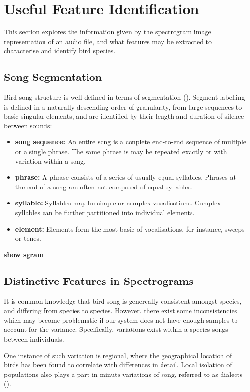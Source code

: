\section{Useful Feature Identification}
This section explores the information given by the spectrogram image
representation of an audio file, and what features may be extracted to
characterise and identify bird species.

\subsection{Song Segmentation}
Bird song structure is well defined in terms of segmentation (\textcite{Catch1997}).
Segment labelling is defined in a naturally descending order of granularity, from
large sequences to basic singular elements, and are identified by their length
and duration of silence between sounds:
\begin{itemize}
  \item \textbf{song sequence:}
    An entire song is a conplete end-to-end sequence of multiple or a single
    phrase.
    The same phrase is may be repeated exactly or with variation within a
    song.
  \item \textbf{phrase:}
    A phrase consists of a series of usually equal syllables.
    Phrases at the end of a song are often not composed of equal syllables.
  \item \textbf{syllable:}
    Syllables may be simple or complex vocalisations.
    Complex syllables can be further partitioned into individual elements.
  \item \textbf{element:}
    Elements form the most basic of vocalisations, for instance, sweeps or tones.
\end{itemize}

\textbf{show sgram}

\subsection{Distinctive Features in Spectrograms}
It is common knowledge that bird song is genereally consistent amongst species,
and differing from species to species.
However, there exist some inconsistencies which may become problematic if our
system does not have enough samples to account for the variance.
Specifically, variations exist within a species songs between individuals.

One instance of such variation is regional, where the geographical
location of birds has been found to correlate with differences in detail.
Local isolation of populations also plays a part in minute variations of song,
referred to as dialects (\textcite{podos2007}).

